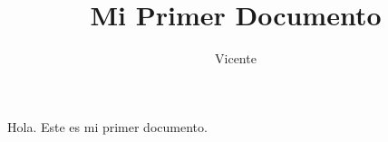 \documentclass{article}
\author{{Vicente}}
\title{Mi Primer Documento}
\begin{document}
\maketitle
Hola. Este es mi primer documento.
\end{document}
